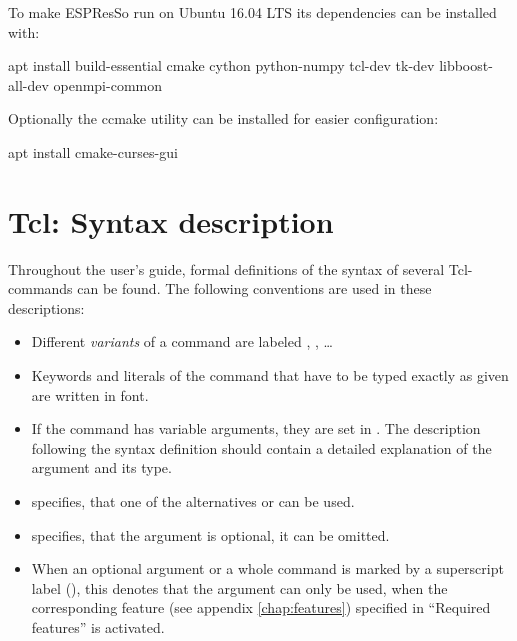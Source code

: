 To make ESPResSo run on Ubuntu 16.04 LTS its dependencies can be installed with:
\begin{code}
  apt install build-essential cmake cython python-numpy tcl-dev
  tk-dev libboost-all-dev openmpi-common
\end{code}
Optionally the ccmake utility can be installed for easier configuration:
\begin{code}
  apt install cmake-curses-gui
\end{code}

\section{Tcl: Syntax description}
\label{sec:syntax}


Throughout the user's guide, formal definitions of the syntax of
several Tcl-commands can be found. The following conventions are used
in these descriptions:
\begin{itemize}
\item Different \emph{variants} of a command are labeled ,
  , \ldots
\item Keywords and literals of the command that have to be typed
  exactly as given are written in  font.
\item If the command has variable arguments, they are set in
  . The description following the syntax definition
  should contain a detailed explanation of the argument and its
  type.
\item \texttt{} specifies, that one
  of the alternatives  or  can be used.
\item \texttt{} specifies, that the argument
   is optional, \ie it can be omitted.
\item When an optional argument or a whole command is marked by a
  superscript label (), this denotes that the argument can
  only be used, when the corresponding feature (see appendix
  \vref{chap:features}) specified in ``Required features'' is
  activated.
\end{itemize}



